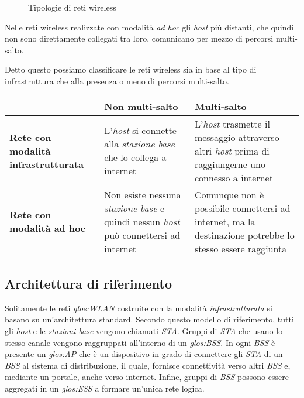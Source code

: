 \begin{figure}[ht!]
    \centering
    \hfill
    \caption{Tipologie di reti wireless}
\end{figure}
\begin{note}
    Nelle reti wireless realizzate con modalità \emph{ad hoc} gli \emph{host}
    più distanti, che quindi non sono direttamente collegati tra loro,
    comunicano per mezzo di percorsi multi-salto.
\end{note}\noindent
Detto questo possiamo classificare le reti wireless sia in base al tipo di
infrastruttura che alla presenza o meno di percorsi multi-salto.
\begin{table}[h!]
    \centering
    \renewcommand{\arraystretch}{1.2}
    \begin{tabular}{|p{}|p{}|p{}|}
        \hline
         & \textbf{Non multi-salto} & \textbf{Multi-salto}\\
        \hline
        \textbf{Rete con modalità infrastrutturata} & L'\emph{host} si connette alla
        \emph{stazione base} che lo collega a internet & L'\emph{host}
        trasmette il messaggio attraverso altri \emph{host} prima di raggiungerne
        uno connesso a internet\\
        \hline
        \textbf{Rete con modalità ad hoc} & Non esiste nessuna \emph{stazione base} e quindi
        nessun \emph{host} può connettersi ad internet & Comunque non è possibile
        connettersi ad internet, ma la destinazione potrebbe lo stesso essere
        raggiunta\\
        \hline
    \end{tabular}
\end{table}

\subsection{Architettura di riferimento}
Solitamente le reti \emph{\gls{glos:WLAN}} costruite con la modalità
\emph{infrastrutturata} si basano su un'architettura standard. Secondo questo
modello di riferimento, tutti gli \emph{host} e le \emph{stazioni base} vengono
chiamati \emph{STA}. Gruppi di \emph{STA} che usano lo stesso canale vengono
raggruppati all'interno di un \emph{\gls{glos:BSS}}. In ogni \emph{BSS} è
presente un \emph{\gls{glos:AP}} che è un dispositivo in grado di connettere
gli \emph{STA} di un \emph{BSS} al sistema di distribuzione, il quale, fornisce
connettività verso altri \emph{BSS} e, mediante un portale, anche verso internet.
Infine, gruppi di \emph{BSS} possono essere aggregati in un \emph{\gls{glos:ESS}}
a formare un'unica rete logica.


